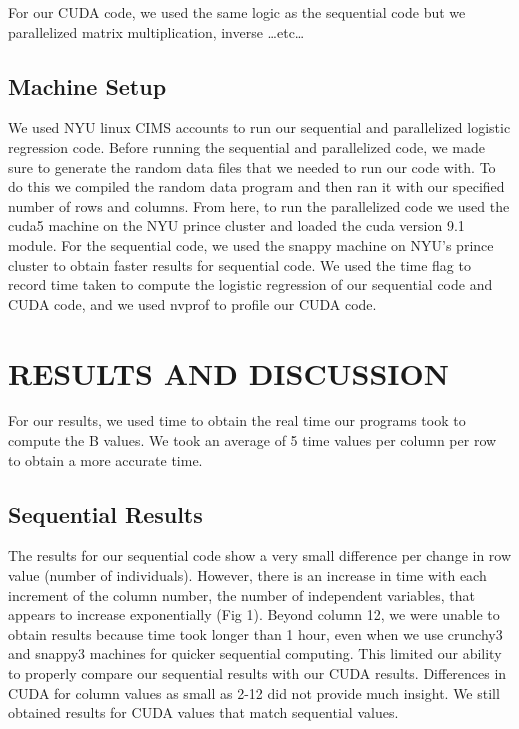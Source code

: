 \documentclass[letterpaper, 10 pt, conference]{ieeeconf}  %
\begin{document}
For our CUDA code, we used the same logic as the sequential code but we parallelized  matrix multiplication, inverse …etc…

\subsection{Machine Setup}

We used NYU linux CIMS accounts to run our sequential and parallelized logistic regression code. Before running the sequential and parallelized code, we made sure to generate the random data files that we needed to run our code with. To do this we compiled the random data program and then ran it with our specified number of rows and columns. From here, to run the parallelized code we used the cuda5 machine on the NYU prince cluster and loaded the cuda version 9.1 module. For the sequential code, we used the snappy machine on NYU’s prince cluster to obtain faster results for sequential code. We used the time flag to record time taken to compute the logistic regression of our sequential code and CUDA code, and we used nvprof to profile our CUDA code. 

\section{RESULTS AND DISCUSSION}

For our results, we used time to obtain the real time our programs took to compute the B values. We took an average of 5 time values per column per row to obtain a more accurate time.

\subsection{Sequential Results}
The results for our sequential code show a very small difference per change in row value (number of individuals). However, there is an increase in time with each increment of the column number, the number of independent variables, that appears to increase exponentially (Fig 1). Beyond column 12, we were unable to obtain results because time took longer than 1 hour, even when we use crunchy3 and snappy3 machines for quicker sequential computing. This limited our ability to properly compare our sequential results with our CUDA results. Differences in CUDA for column values as small as 2-12 did not provide much insight. We still obtained results for CUDA values that match sequential values. 
\end{document}
